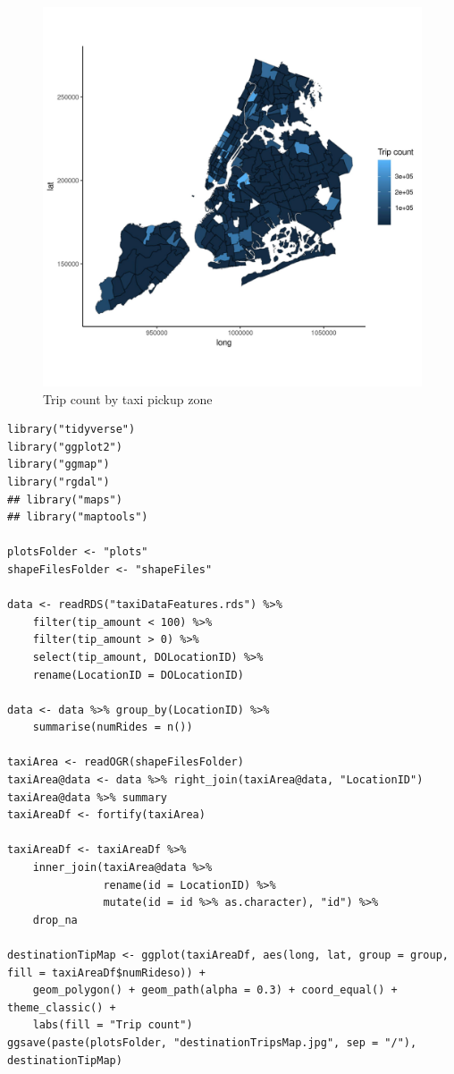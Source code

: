 \documentclass[11pt]{article}
\begin{document}
\begin{figure}[htbp]
\centering
\includegraphics[width=.9\linewidth]{./plots/pickupTripsMap.jpg}
\caption{\label{fig:orgee0c997}
Trip count by taxi pickup zone}
\end{figure}



\begin{verbatim}
library("tidyverse")
library("ggplot2")
library("ggmap")
library("rgdal")
## library("maps")
## library("maptools")

plotsFolder <- "plots"
shapeFilesFolder <- "shapeFiles"

data <- readRDS("taxiDataFeatures.rds") %>%
    filter(tip_amount < 100) %>%
    filter(tip_amount > 0) %>%
    select(tip_amount, DOLocationID) %>%
    rename(LocationID = DOLocationID)

data <- data %>% group_by(LocationID) %>%
    summarise(numRides = n())

taxiArea <- readOGR(shapeFilesFolder)
taxiArea@data <- data %>% right_join(taxiArea@data, "LocationID")
taxiArea@data %>% summary
taxiAreaDf <- fortify(taxiArea)

taxiAreaDf <- taxiAreaDf %>%
    inner_join(taxiArea@data %>%
               rename(id = LocationID) %>%
               mutate(id = id %>% as.character), "id") %>%
    drop_na

destinationTipMap <- ggplot(taxiAreaDf, aes(long, lat, group = group, fill = taxiAreaDf$numRideso)) +
    geom_polygon() + geom_path(alpha = 0.3) + coord_equal() + theme_classic() +
    labs(fill = "Trip count")
ggsave(paste(plotsFolder, "destinationTripsMap.jpg", sep = "/"), destinationTipMap)
\end{verbatim}
\end{document}
